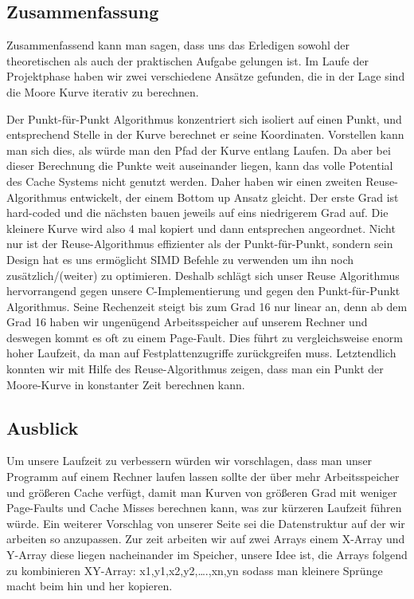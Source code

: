 \documentclass[course=erap]{aspdoc}
\begin{document}
\subsection{Zusammenfassung}
Zusammenfassend kann man sagen, dass uns das Erledigen sowohl der theoretischen als auch der praktischen Aufgabe gelungen ist. Im Laufe der Projektphase haben wir zwei verschiedene Ansätze gefunden, die in der Lage sind die Moore Kurve iterativ zu berechnen.

Der Punkt-für-Punkt Algorithmus konzentriert sich isoliert auf einen Punkt, und entsprechend Stelle in der Kurve berechnet er seine Koordinaten. Vorstellen kann man sich dies, als würde man den Pfad der Kurve entlang Laufen. Da aber bei dieser Berechnung die Punkte weit auseinander liegen, kann das volle Potential des Cache Systems nicht genutzt werden. 
Daher haben wir einen zweiten Reuse-Algorithmus entwickelt, der einem Bottom up Ansatz gleicht. Der erste Grad ist hard-coded und die nächsten bauen jeweils auf eins niedrigerem Grad auf. Die kleinere Kurve wird also 4 mal kopiert und dann entsprechen angeordnet.
Nicht nur ist der Reuse-Algorithmus effizienter als der Punkt-für-Punkt, sondern sein Design hat es uns ermöglicht SIMD Befehle zu verwenden um ihn noch zusätzlich/(weiter) zu optimieren. Deshalb schlägt sich unser Reuse Algorithmus hervorrangend gegen unsere C-Implementierung und gegen den Punkt-für-Punkt Algorithmus. Seine Rechenzeit steigt bis zum Grad 16 nur linear an, denn ab dem  Grad 16 haben wir  ungenügend Arbeitsspeicher auf unserem Rechner und deswegen kommt es oft zu einem Page-Fault. Dies führt zu vergleichsweise enorm hoher Laufzeit, da man auf Festplattenzugriffe zurückgreifen muss.
Letztendlich konnten wir mit Hilfe des Reuse-Algorithmus zeigen, dass man ein Punkt der Moore-Kurve in konstanter Zeit berechnen kann.
\subsection{Ausblick}
Um unsere Laufzeit zu verbessern würden wir vorschlagen, dass man unser Programm auf einem Rechner laufen lassen sollte der über mehr Arbeitsspeicher und größeren Cache verfügt, damit man Kurven von größeren Grad mit weniger Page-Faults und Cache Misses berechnen kann, was zur kürzeren Laufzeit führen würde.
Ein weiterer Vorschlag von unserer Seite sei die Datenstruktur auf der wir arbeiten so anzupassen. Zur zeit arbeiten wir auf zwei Arrays einem X-Array und Y-Array diese liegen nacheinander im Speicher, unsere Idee ist, die Arrays folgend zu kombinieren XY-Array: x1,y1,x2,y2,….,xn,yn
sodass man kleinere Sprünge macht beim hin und her kopieren. 



{}
\end{document}
